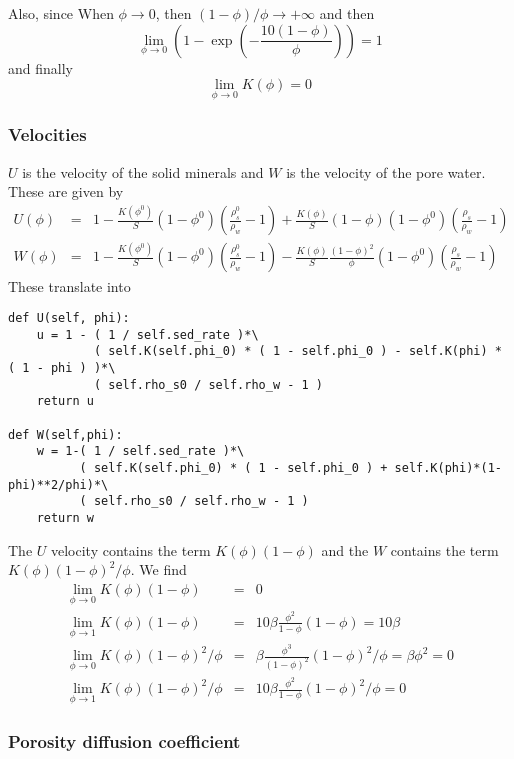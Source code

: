 \documentclass[a4paper]{article}
\newcommand{\nn}{\nonumber}
\begin{document}
Also, since When $\phi \rightarrow 0$, then $(1-\phi)/\phi \rightarrow +\infty$ and then
\[
\lim_{\phi \rightarrow 0} \left( 1-\exp\left( -\frac{10(1-\phi)}{\phi} \right) \right) = 1 
\]
and finally
\[
\lim_{\phi\rightarrow 0} K(\phi) = 0
\]

\subsubsection*{Velocities}
$U$ is the velocity of the solid minerals and $W$ is the velocity of the pore water.  These are given by
\begin{eqnarray}
U(\phi)&=& 1-\frac{K(\phi^0)}{S}(1-\phi^0)(\frac{\rho_s^0}{\rho_w}-1) 
+\frac{K(\phi)}{S}(1-\phi) (1-\phi^0)(\frac{\rho_s}{\rho_w}-1)    \\
W(\phi)&=& 1-\frac{K(\phi^0)}{S}(1-\phi^0)(\frac{\rho_s^0}{\rho_w}-1) 
-\frac{K(\phi)}{S} \frac{(1-\phi)^2}{\phi} (1-\phi^0)(\frac{\rho_s}{\rho_w}-1)   
\end{eqnarray}
These translate into
\begin{lstlisting}
def U(self, phi):
    u = 1 - ( 1 / self.sed_rate )*\
            ( self.K(self.phi_0) * ( 1 - self.phi_0 ) - self.K(phi) * ( 1 - phi ) )*\
            ( self.rho_s0 / self.rho_w - 1 )
    return u

def W(self,phi):
    w = 1-( 1 / self.sed_rate )*\
          ( self.K(self.phi_0) * ( 1 - self.phi_0 ) + self.K(phi)*(1-phi)**2/phi)*\
          ( self.rho_s0 / self.rho_w - 1 )
    return w
\end{lstlisting}
The $U$ velocity contains the term $K(\phi)(1-\phi)$
and the $W$ contains the term $K(\phi)(1-\phi)^2/\phi$.
We find
\begin{eqnarray}
\lim_{\phi\rightarrow 0} K(\phi)(1-\phi) &=& 0 \nn\\
\lim_{\phi\rightarrow 1} K(\phi)(1-\phi) &=& 10 \beta \frac{\phi^2}{1-\phi}(1-\phi) = 10 \beta\nn\\
\lim_{\phi\rightarrow 0} K(\phi)(1-\phi)^2/\phi 
&=& \beta  \frac{\phi^3}{(1-\phi)^2} (1-\phi)^2/\phi = \beta \phi^2 = 0 \nn\\
\lim_{\phi\rightarrow 1} K(\phi)(1-\phi)^2/\phi &=& 10 \beta \frac{\phi^2}{1-\phi} (1-\phi)^2/\phi = 0 \nn
\end{eqnarray}

\subsubsection*{Porosity diffusion coefficient}
\end{document}
